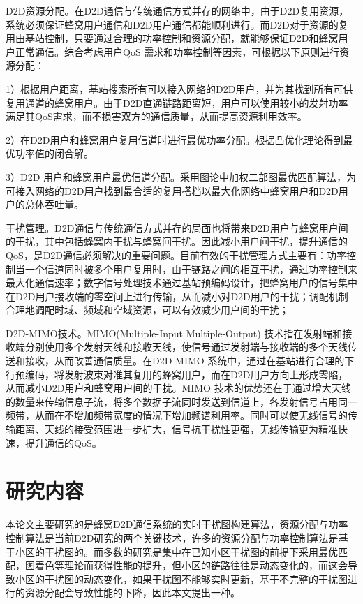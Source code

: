 \documentclass[figurelist,tablelist,algorithmlist,nomlist,masters]{seuthesix}
\begin{document}
	D2D资源分配。在D2D通信与传统通信方式并存的网络中，由于D2D复用资源，系统必须保证蜂窝用户通信和D2D用户通信都能顺利进行。而D2D对于资源的复用由基站控制，只要通过合理的功率控制和资源分配，就能够保证D2D和蜂窝用户正常通信。综合考虑用户QoS 需求和功率控制等因素，可根据以下原则进行资源分配：
	
	1）根据用户距离，基站搜索所有可以接入网络的D2D用户，并为其找到所有可供复用通道的蜂窝用户。由于D2D直通链路距离短，用户可以使用较小的发射功率满足其QoS需求，而不损害双方的通信质量，从而提高资源利用效率。
	
	2）在D2D用户和蜂窝用户复用信道时进行最优功率分配。根据凸优化理论得到最优功率值的闭合解。
	
	3）D2D 用户和蜂窝用户最优信道分配。采用图论中加权二部图最优匹配算法，为可接入网络的D2D用户找到最合适的复用搭档以最大化网络中蜂窝用户和D2D用户的总体吞吐量。
	
	干扰管理。D2D通信与传统通信方式并存的局面也将带来D2D用户与蜂窝用户间的干扰，其中包括蜂窝内干扰与蜂窝间干扰。因此减小用户间干扰，提升通信的 QoS，是D2D通信必须解决的重要问题。目前有效的干扰管理方式主要有：功率控制当一个信道同时被多个用户复用时，由于链路之间的相互干扰，通过功率控制来最大化通信速率；数字信号处理技术通过基站预编码设计，把蜂窝用户的信号集中在D2D用户接收端的零空间上进行传输，从而减小对D2D用户的干扰；调配机制合理地调配时域、频域和空域资源，可以有效减少用户间的干扰；
	
	D2D-MIMO技术。MIMO(Multiple-Input Multiple-Output) 技术指在发射端和接收端分别使用多个发射天线和接收天线，使信号通过发射端与接收端的多个天线传送和接收，从而改善通信质量。在D2D-MIMO 系统中，通过在基站进行合理的下行预编码，将发射波束对准其复用的蜂窝用户，而在D2D用户方向上形成零陷，从而减小D2D用户和蜂窝用户间的干扰。MIMO 技术的优势还在于通过增大天线的数量来传输信息子流，将多个数据子流同时发送到信道上，各发射信号占用同一频带，从而在不增加频带宽度的情况下增加频谱利用率。同时可以使无线信号的传输距离、天线的接受范围进一步扩大，信号抗干扰性更强，无线传输更为精准快速，提升通信的QoS。
	
	
	\section{研究内容}
	
	本论文主要研究的是蜂窝D2D通信系统的实时干扰图构建算法，资源分配与功率控制算法是当前D2D研究的两个关键技术，许多的资源分配与功率控制算法是基于小区的干扰图的。而多数的研究是集中在已知小区干扰图的前提下采用最优匹配，图着色等理论而获得性能的提升，但小区的链路往往是动态变化的，而这会导致小区的干扰图的动态变化，如果干扰图不能够实时更新，基于不完整的干扰图进行的资源分配会导致性能的下降，因此本文提出一种。
	
\end{document}
